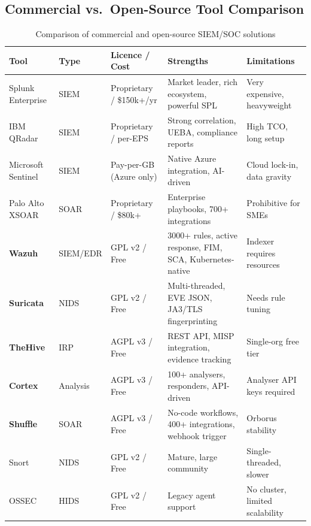 \documentclass[12pt,a4paper]{report}
\begin{document}
\subsection{Commercial vs.\ Open-Source Tool Comparison}

\begin{table}[H]
\centering
\caption{Comparison of commercial and open-source SIEM/SOC solutions}
\begin{tabularx}{\textwidth}{llXXl}
\toprule
\textbf{Tool} & \textbf{Type} & \textbf{Licence / Cost} & \textbf{Strengths} & \textbf{Limitations} \\
\midrule
Splunk Enterprise & SIEM & Proprietary / \$150k+/yr & Market leader, rich ecosystem, powerful SPL & Very expensive, heavyweight \\
IBM QRadar        & SIEM & Proprietary / per-EPS    & Strong correlation, UEBA, compliance reports & High TCO, long setup \\
Microsoft Sentinel & SIEM & Pay-per-GB (Azure only)  & Native Azure integration, AI-driven & Cloud lock-in, data gravity \\
Palo Alto XSOAR   & SOAR & Proprietary / \$80k+     & Enterprise playbooks, 700+ integrations & Prohibitive for SMEs \\
\midrule
\textbf{Wazuh}    & SIEM/EDR & GPL v2 / Free      & 3000+ rules, active response, FIM, SCA, Kubernetes-native & Indexer requires resources \\
\textbf{Suricata} & NIDS     & GPL v2 / Free      & Multi-threaded, EVE JSON, JA3/TLS fingerprinting & Needs rule tuning \\
\textbf{TheHive}  & IRP      & AGPL v3 / Free     & REST API, MISP integration, evidence tracking & Single-org free tier \\
\textbf{Cortex}   & Analysis & AGPL v3 / Free     & 100+ analysers, responders, API-driven & Analyser API keys required \\
\textbf{Shuffle}  & SOAR     & AGPL v3 / Free     & No-code workflows, 400+ integrations, webhook trigger & Orborus stability \\
Snort             & NIDS     & GPL v2 / Free      & Mature, large community & Single-threaded, slower \\
OSSEC             & HIDS     & GPL v2 / Free      & Legacy agent support & No cluster, limited scalability \\
\bottomrule
\end{tabularx}
\label{tab:comparison}
\end{table}
\end{document}
